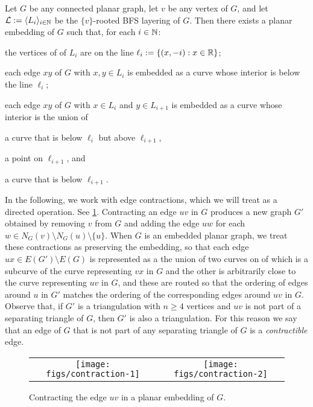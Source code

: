 \documentclass{patmorin}
\begin{document}
\begin{thm}\label{pupyrev}
    Let $G$ be any connected planar graph, let $v$ be any vertex of $G$, and let $\mathcal{L}:=\langle L_i\rangle_{i\in\mathbb{N}}$ be the $\{v\}$-rooted BFS layering of $G$.  Then there exists a planar embedding of $G$ such that, for each $i\in\mathbb{N}$:
    \begin{compactenum}
      \item the vertices of of $L_i$ are on the line $\ell_i:=\{(x,-i):x\in\mathbb{R}\}$;
      \item each edge $xy$ of $G$ with $x,y\in L_i$ is embedded as a curve whose interior is below the line $\ell_i$;
      \item each edge $xy$ of $G$ with $x\in L_i$ and $y\in L_{i+1}$ is embedded as a curve whose interior is the union of
      \begin{inparaenum}[(i)]
        \item a curve that is below $\ell_i$ but above $\ell_{i+1}$,
        \item a point on $\ell_{i+1}$, and
        \item a curve that is below $\ell_{i+1}$.
      \end{inparaenum}
    \end{compactenum}
\end{thm}

In the following, we work with edge contractions, which we will treat as a directed operation. See \cref{contraction}. Contracting an edge $uv$ in $G$ produces a new graph $G'$ obtained by removing $v$ from $G$ and adding the edge $uw$ for each $w\in N_G(v)\setminus N_G(u)\setminus\{u\}$.  When $G$ is an embedded planar graph, we treat these contractions as preserving the embedding, so that each edge $ux\in E(G')\setminus E(G)$ is represented as a the union of two curves on of which is a subcurve of the curve representing $vx$ in $G$ and the other is arbitrarily close to the curve representing $uv$ in $G$, and these are routed so that the ordering of edges around $u$ in $G'$ matches the ordering of the corresponding edges around $uv$ in $G$.  Observe that, if $G'$ is a triangulation with $n\ge 4$ vertices and $uv$ is not part of a separating triangle of $G$, then $G'$ is also a triangulation.  For this reason we say that an edge of $G$ that is not part of any separating triangle of $G$ is a \emph{contractible} edge.

\begin{figure}
    \begin{center}
        \begin{tabular}{cc}
            \texttt{[image: figs/contraction-1]} &
            \texttt{[image: figs/contraction-2]}
        \end{tabular}
    \end{center}
    \caption{Contracting the edge $uv$ in a planar embedding of $G$.}
    \label{contraction}
\end{figure}
\end{document}
